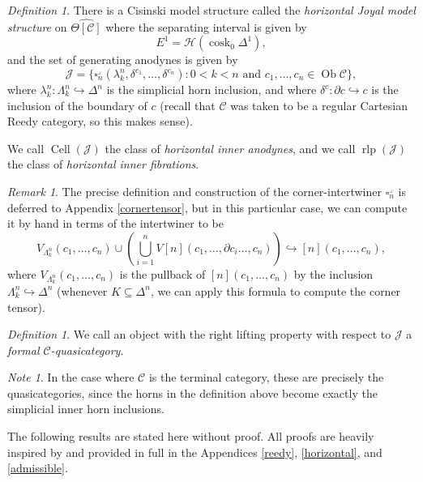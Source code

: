 \documentclass{amsart}
\numberwithin{equation}{section}
\theoremstyle{plain}   %
\theoremstyle{remark}
\newtheorem{rem}[subsection]{Remark}
\newtheorem{note}[subsection]{Note}
\newtheorem{defn}[subsection]{Definition}
\theoremstyle{plain}
\DeclareMathOperator{\Ob}{Ob}
\newcommand{\C}{\ensuremath{\mathcal{C}}}
\newcommand{\cellset}{\ensuremath{\widehat{\Theta[\mathcal{C}]}}}
\begin{document}
\begin{defn}
	There is a Cisinski model structure called the \emph{horizontal Joyal model structure} on \(\cellset\) where the separating interval is given by 
	\[E^1=\mathscr{H}(\operatorname{cosk}_0 \Delta^1),\]
	and the set of generating anodynes is given by
	\[\mathscr{J}=\{\square_n^\lrcorner(\lambda^n_k,\delta^{c_1},\dots,\delta^{c_n}) : 0<k<n \text{ and } c_1,\dots,c_n \in \Ob \C\},\]
	where \(\lambda^n_k:\Lambda^n_k\hookrightarrow \Delta^n\) is the simplicial horn inclusion, and where \(\delta^c:\partial c \hookrightarrow c\) is the inclusion of the boundary of \(c\) (recall that \(\C\) was taken to be a regular Cartesian Reedy category, so this makes sense).

	We call \(\operatorname{Cell}(\mathscr{J})\) the class of \emph{horizontal inner anodynes}, and we call \(\operatorname{rlp}(\mathscr{J})\) the class of \emph{horizontal inner fibrations}.
\end{defn}

\begin{rem}
	The precise definition and construction of the corner-intertwiner \(\square^\lrcorner_n\) is deferred to Appendix \ref{cornertensor}, but in this particular case, we can compute it by hand in terms of the intertwiner to be \[V_{\Lambda^n_k}(c_1,\dots,c_n) \cup \left(\bigcup_{i=1}^n V[n](c_1,\dots,\partial c_i \dots, c_n) \right) \hookrightarrow [n](c_1,\dots,c_n),\] where \(V_{\Lambda^n_k}(c_1,\dots,c_n)\) is the pullback of \([n](c_1,\dots,c_n)\) by the inclusion \(\Lambda^n_k\hookrightarrow \Delta^n\) (whenever \(K\subseteq \Delta^n\), we can apply this formula to compute the corner tensor).
\end{rem}

\begin{defn}
	We call an object with the right lifting property with respect to \(\mathscr{J}\) a \emph{formal \(\C\)-quasicategory}.
\end{defn}

\begin{note} 
	In the case where \(\C\) is the terminal category, these are precisely the quasicategories, since the horns in the definition above become exactly the simplicial inner horn inclusions.
\end{note}

The following results are stated here without proof.  All proofs are heavily inspired by \cite{oury} and provided in full in the Appendices \ref{reedy}, \ref{horizontal}, and \ref{admissible}.
\end{document}
